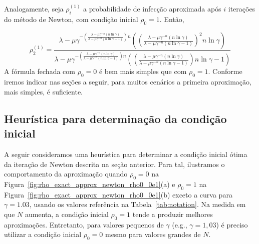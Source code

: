 		Analogamente, seja $\rho_i^{(1)}$ a probabilidade de infecção aproximada após $i$ iterações do método de Newton, com condição inicial $\rho_0=1$. Então, 
 
    	\begin{equation}
    	  \rho_2^{(1)}    = \frac{ \lambda - \mu \gamma^{-\left( \frac{ \lambda - \mu \gamma^{- n }  \left( n  \ln \gamma    \right) }  { \lambda - \mu \gamma^{- n }  \left( n  \ln \gamma  -1 \right) }  \right) n } \left( \left( \frac{ \lambda - \mu \gamma^{- n }  \left( n  \ln \gamma    \right) }  { \lambda - \mu \gamma^{- n }  \left( n  \ln \gamma  -1 \right) }  \right)^{2} n \ln \gamma \right) }  
    		                    { \lambda - \mu \gamma^{-\left( \frac{ \lambda - \mu \gamma^{- n }  \left( n  \ln \gamma    \right) }  { \lambda - \mu \gamma^{- n }  \left( n  \ln \gamma  -1 \right) }  \right) n } \left( \left( \frac{ \lambda - \mu \gamma^{- n }  \left( n  \ln \gamma    \right) }  { \lambda - \mu \gamma^{- n }  \left( n  \ln \gamma  -1 \right) }  \right)     n \ln \gamma -1 \right) } 
    		                    \label{eq:rho_2iter_rho0_1}
    	\end{equation}
	    A fórmula fechada com $\rho_0=0$ é bem mais simples que com $\rho_0=1$. Conforme iremos indicar nas seções a seguir, para muitos cenários a primeira aproximação, mais simples, é suficiente.  


    	\subsection{Heurística para determinação da condição inicial}
	    \label{subsec:heuristica}
    	A seguir consideramos uma heurística para determinar a condição inicial ótima da iteração de Newton descrita na seção anterior.  Para tal, ilustramos o comportamento da aproximação quando $\rho_0=0$ na Figura~\ref{fig:rho_exact_approx_newton_rho0_0e1}(a) e $\rho_0=1$ na Figura~\ref{fig:rho_exact_approx_newton_rho0_0e1}(b) exceto a curva para $\gamma=1.03$, usando os valores referência na Tabela~\ref{tab:notation}. %
    	Na medida em que $N$ aumenta, a condição inicial $\rho_0=1$ tende a produzir melhores aproximações.  Entretanto, para valores pequenos de $\gamma$ (e.g., $\gamma=1,03$) é preciso utilizar a condição inicial $\rho_0=0$ mesmo para valores grandes de $N$.


